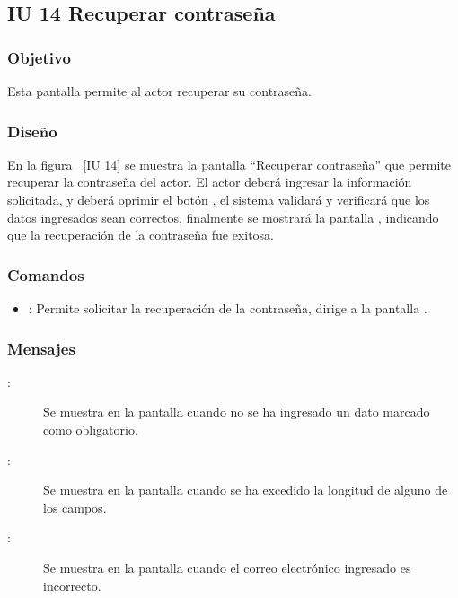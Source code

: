 \subsection{IU 14 Recuperar contraseña}

\subsubsection{Objetivo}
	
	Esta pantalla permite al actor recuperar su contraseña.

\subsubsection{Diseño}

    En la figura ~\ref{IU 14} se muestra la pantalla ``Recuperar contraseña'' que permite recuperar la contraseña del actor. El actor deberá ingresar la información solicitada, y deberá oprimir el botón , el sistema validará y verificará que los datos ingresados sean correctos, finalmente se mostrará la pantalla , indicando que la recuperación de la contraseña fue exitosa.


   

\subsubsection{Comandos}
\begin{itemize}
	\item {}: Permite solicitar la recuperación de la contraseña, dirige a la pantalla .
\end{itemize}

\subsubsection{Mensajes}

	
\begin{description}
	\item[:] Se muestra en la pantalla  cuando no se ha ingresado un dato marcado como obligatorio.
	\item[:] Se muestra en la pantalla  cuando se ha excedido la longitud de alguno de los campos.
	\item[:] Se muestra en la pantalla  cuando el correo electrónico ingresado es incorrecto.
\end{description}
